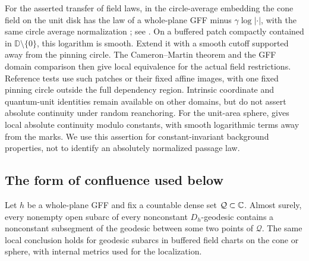 For the asserted transfer of field laws, in the circle-average
embedding the cone field on the unit disk has the law of a
whole-plane GFF minus $\gamma\log|\cdot|$, with the same circle
average normalization
\cite[Definition~4.10]{DMS}; see
\cite[Section~4.1.1]{DingGwynneDimension}. On a buffered patch compactly
contained in $\mathbb D\setminus\{0\}$, this logarithm is smooth.
Extend it with a smooth cutoff supported away from the pinning circle.
The Cameron--Martin theorem and the GFF domain comparison
\cite[Lemma~2.1]{DingGwynneDimension} then give local equivalence for
the actual field restrictions. Reference tests use such patches or
their fixed affine images, with one fixed pinning circle outside the
full dependency region. Intrinsic coordinate and quantum-unit identities
remain available on other domains, but do not assert absolute continuity
under random reanchoring. For the unit-area sphere,
\cite[Lemma~2.4]{BorgaGwynneSunPermutons} gives local absolute continuity
modulo constants, with smooth logarithmic terms away from the marks.
We use this assertion for constant-invariant background properties,
not to identify an absolutely normalized passage law.

\subsection{The form of confluence used below}

\begin{proposition}
\label{tree:prop:background_confluence}
Let $h$ be a whole-plane GFF and fix a countable dense set
$\mathcal Q\subset\mathbb C$. Almost surely, every nonempty open
subarc of every nonconstant $D_h$-geodesic contains a
nonconstant subsegment of the geodesic between some two points
of $\mathcal Q$. The same local conclusion holds for geodesic
subarcs in buffered field charts on the cone or sphere, with
internal metrics used for the localization.
\end{proposition}

